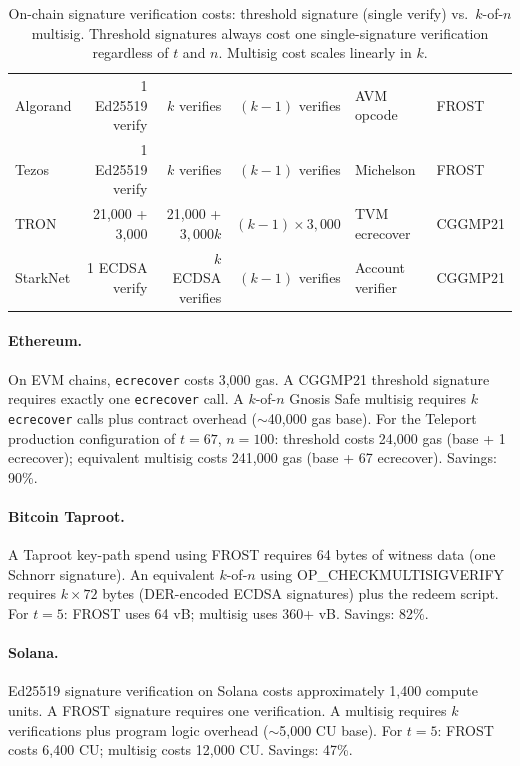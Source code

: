 \documentclass[11pt,twocolumn]{article}
\begin{document}
\begin{table}[t]
\begin{tabular}{@{}lrrrll@{}}
Algorand & 1 Ed25519 verify & $k$ verifies & $(k{-}1)$ verifies & AVM opcode & FROST \\
Tezos & 1 Ed25519 verify & $k$ verifies & $(k{-}1)$ verifies & Michelson & FROST \\
TRON & 21,000 + 3,000 & 21,000 + $3{,}000k$ & $(k{-}1) \times 3{,}000$ & TVM ecrecover & CGGMP21 \\
StarkNet & 1 ECDSA verify & $k$ ECDSA verifies & $(k{-}1)$ verifies & Account verifier & CGGMP21 \\
\bottomrule
\end{tabular}
\caption{On-chain signature verification costs: threshold signature (single verify) vs.\ $k$-of-$n$ multisig. Threshold signatures always cost one single-signature verification regardless of $t$ and $n$. Multisig cost scales linearly in $k$.}
\label{tab:gas}
\end{table}

\paragraph{Ethereum.} On EVM chains, \texttt{ecrecover} costs 3,000 gas. A
CGGMP21 threshold signature requires exactly one \texttt{ecrecover} call. A
$k$-of-$n$ Gnosis Safe multisig requires $k$ \texttt{ecrecover} calls plus
contract overhead ($\sim$40,000 gas base). For the Teleport production configuration
of $t = 67$, $n = 100$: threshold costs 24,000 gas (base + 1 ecrecover);
equivalent multisig costs 241,000 gas (base + 67 ecrecover). Savings: 90\%.

\paragraph{Bitcoin Taproot.} A Taproot key-path spend using FROST requires 64 bytes
of witness data (one Schnorr signature). An equivalent $k$-of-$n$ using
OP\_CHECKMULTISIGVERIFY requires $k \times 72$ bytes (DER-encoded ECDSA signatures)
plus the redeem script. For $t = 5$: FROST uses 64 vB; multisig uses 360+ vB.
Savings: 82\%.

\paragraph{Solana.} Ed25519 signature verification on Solana costs approximately
1,400 compute units. A FROST signature requires one verification. A multisig requires
$k$ verifications plus program logic overhead ($\sim$5,000 CU base). For $t = 5$:
FROST costs 6,400 CU; multisig costs 12,000 CU. Savings: 47\%.
\end{document}
